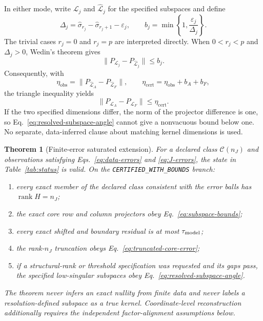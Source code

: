 \documentclass[aps,prl,reprint,superscriptaddress,nofootinbib]{revtex4-2}
\newcommand{\rank}{\operatorname{rank}}
\newcommand{\obs}{\mathrm{obs}}
\newcommand{\cert}{\mathrm{cert}}
\newcommand{\eps}{\varepsilon}
\newcommand{\cC}{\mathcal C}
\newtheorem{theorem}{Theorem}
\begin{document}
In either mode, write $\mathcal L_j$ and $\widehat{\mathcal L}_j$ for the specified subspaces and define
\begin{equation}
 \Delta_j=\widehat\sigma_{r_j}-\widehat\sigma_{r_j+1}-\eps_j,
 \qquad
 b_j=\min\left\{1,\frac{\eps_j}{\Delta_j}\right\}.
 \label{eq:response-subspace-gaps}
\end{equation}
The trivial cases $r_j=0$ and $r_j=p$ are interpreted directly.  When $0<r_j<p$ and $\Delta_j>0$, Wedin's theorem gives
\begin{equation}
 \|P_{\mathcal L_j}-P_{\widehat{\mathcal L}_j}\|\le b_j.
 \label{eq:response-subspace-wedin}
\end{equation}
Consequently, with
\begin{equation}
 \eta_{\obs}=\|P_{\widehat{\mathcal L}_A}-P_{\widehat{\mathcal L}_F}\|,
 \qquad
 \eta_{\cert}=\eta_{\obs}+b_A+b_F,
 \label{eq:eta-two-matrix}
\end{equation}
the triangle inequality yields
\begin{equation}
 \|P_{\mathcal L_A}-P_{\mathcal L_F}\|\le\eta_{\cert}.
 \label{eq:resolved-subspace-angle}
\end{equation}
If the two specified dimensions differ, the norm of the projector difference is one, so Eq.~\eqref{eq:resolved-subspace-angle} cannot give a nonvacuous bound below one.  No separate, data-inferred clause about matching kernel dimensions is used.

\begin{theorem}[Finite-error saturated extension]
\label{thm:P}
For a declared class $\cC(n_J)$ and observations satisfying Eqs.~\eqref{eq:data-errors} and \eqref{eq:J-errors}, the state in Table~\ref{tab:status} is valid.  On the \texttt{CERTIFIED\_WITH\_BOUNDS} branch:
\begin{enumerate}
\item every exact member of the declared class consistent with the error balls has $\rank H=n_J$;
\item the exact core row and column projectors obey Eq.~\eqref{eq:subspace-bounds};
\item every exact shifted and boundary residual is at most $\tau_{\rm model}$;
\item the rank-$n_J$ truncation obeys Eq.~\eqref{eq:truncated-core-error};
\item if a structural-rank or threshold specification was requested and its gaps pass, the specified low-singular subspaces obey Eq.~\eqref{eq:resolved-subspace-angle}.
\end{enumerate}
The theorem never infers an exact nullity from finite data and never labels a resolution-defined subspace as a true kernel.  Coordinate-level reconstruction additionally requires the independent factor-alignment assumptions below.
\end{theorem}
\end{document}
